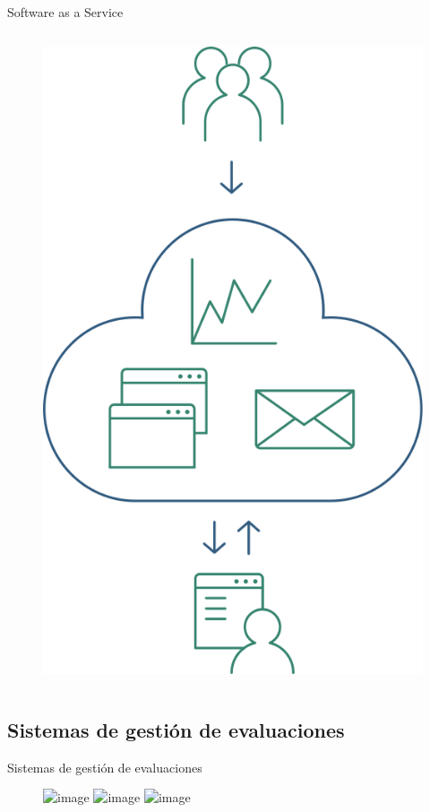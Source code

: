 \documentclass[10pt,xcolor=table ]{beamer}
\begin{document}
\begin{frame}{Software as a Service}
\begin{columns}[c,onlytextwidth]
\begin{figure}[H]
			\includegraphics[scale=0.23]{../Figuras/saas}
		\end{figure}
  	\end{columns}
\end{frame}

\subsection{Sistemas de gestión de evaluaciones}
\begin{frame}{Sistemas de gestión de evaluaciones}
	\begin{figure}
		\centering
	    \includegraphics<1>[scale=0.55]{../Figuras/ams_1}
	    \includegraphics<2>[scale=0.55]{../Figuras/ams_2}
	    \includegraphics<3>[scale=0.55]{../Figuras/ams_3}
	\end{figure}
\end{frame}
\end{document}

